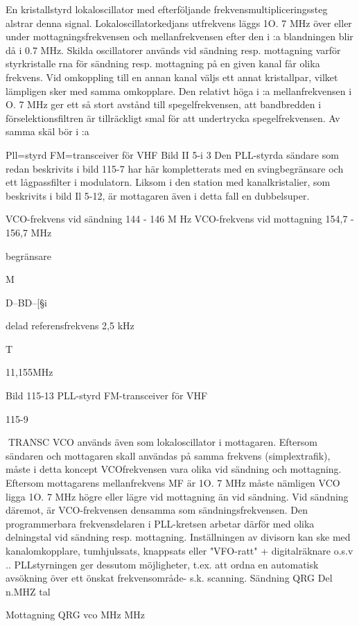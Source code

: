 En kristallstyrd lokaloscillator med efterföljande frekvensmultipliceringssteg alstrar
denna signal.
Lokaloscillatorkedjans utfrekvens läggs
1O. 7 MHz över eller under mottagningsfrekvensen och mellanfrekvensen efter den i :a
blandningen blir då i 0.7 MHz. Skilda oscillatorer används vid sändning resp. mottagning varför styrkristalle rna för sändning resp.
mottagning på en given kanal får olika frekvens. Vid omkoppling till en annan kanal
väljs ett annat kristallpar, vilket lämpligen
sker med samma omkopplare.
Den relativt höga i :a mellanfrekvensen
i O. 7 MHz ger ett så stort avstånd till spegelfrekvensen, att bandbredden i förselektionsfiltren är tillräckligt smal för att undertrycka
spegelfrekvensen. Av samma skäl bör i :a

Pll=styrd FM=transceiver för VHF
Bild II 5-i 3
Den PLL-styrda sändare som redan beskrivits i bild 115-7 har här kompletterats med en
svingbegränsare och ett lågpassfilter i modulatorn. Liksom i den station med kanalkristalier, som beskrivits i bild Il 5-12, är mottagaren även i detta fall en dubbelsuper.

VCO-frekvens vid sändning
144 - 146 M Hz
VCO-frekvens vid mottagning 154,7 - 156,7 MHz

begränsare

M

D--{BD--[§}i~

delad
referensfrekvens 2,5 kHz

T

11,155MHz

Bild 115-13 PLL-styrd FM-transceiver för VHF

115-9

TRANSC
VCO används även som lokaloscillator i
mottagaren. Eftersom sändaren och mottagaren skall användas på samma frekvens
(simplextrafik), måste i detta koncept VCOfrekvensen vara olika vid sändning och mottagning. Eftersom mottagarens mellanfrekvens MF är 1O. 7 MHz måste nämligen VCO
ligga 1O. 7 MHz högre eller lägre vid mottagning än vid sändning. Vid sändning däremot, är VCO-frekvensen densamma som
sändningsfrekvensen.
Den programmerbara frekvensdelaren i
PLL-kretsen arbetar därför med olika delningstal vid sändning resp. mottagning. Inställningen av divisorn kan ske med kanalomkopplare, tumhjulssats, knappsats eller
"VFO-ratt" + digitalräknare o.s.v .. PLLstyrningen ger dessutom möjligheter, t.ex.
att ordna en automatisk avsökning över ett
önskat frekvensområde- s.k. scanning.
Sändning
QRG
Del n.MHZ
tal

Mottagning
QRG
vco
MHz
MHz

